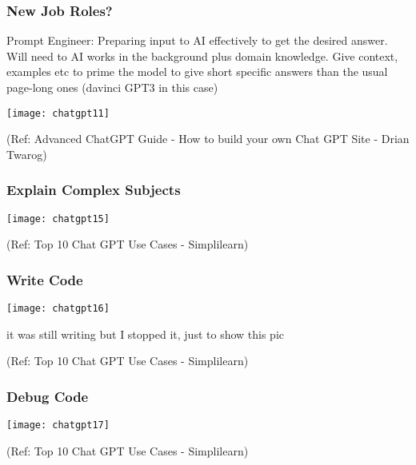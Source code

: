 \begin{frame}[fragile]\frametitle{New Job Roles?}
Prompt Engineer: Preparing input to AI effectively to get the desired answer. Will need to AI works in the background plus domain knowledge. Give context, examples etc to prime the model to give short specific answers than the usual page-long ones (davinci GPT3 in this case)

			\begin{center}
			\texttt{[image: chatgpt11]}
			
			\end{center}		
			
			{\tiny (Ref: Advanced ChatGPT Guide - How to build your own Chat GPT Site - Drian Twarog)}
			

\end{frame}

\begin{frame}[fragile]\frametitle{Explain Complex Subjects}
\begin{center}
\texttt{[image: chatgpt15]}
\end{center}
	
{\tiny (Ref: Top 10 Chat GPT Use Cases - Simplilearn)}
\end{frame}

\begin{frame}[fragile]\frametitle{Write Code}
\begin{center}
\texttt{[image: chatgpt16]}
\end{center}

it was still writing but I stopped it, just to show this pic

{\tiny (Ref: Top 10 Chat GPT Use Cases - Simplilearn)}
\end{frame}

\begin{frame}[fragile]\frametitle{Debug Code}
\begin{center}
\texttt{[image: chatgpt17]}
\end{center}

{\tiny (Ref: Top 10 Chat GPT Use Cases - Simplilearn)}
\end{frame}

